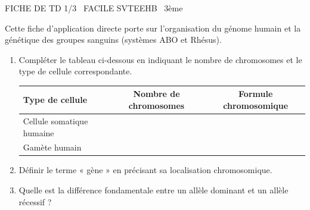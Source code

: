 \documentclass[11pt]{article}
\begin{document}
\begin{tcolorbox}[enhanced,colback=popink,colframe=popink,arc=10pt,boxrule=0pt,left=12pt,right=12pt,top=9pt,bottom=9pt]
{\color{white}\popxbold\small FICHE DE TD 1/3 \textbullet\ FACILE \hfill SVTEEHB \textbullet\ 3ème\par}
\end{tcolorbox}
\vspace{4pt}
Cette fiche d'application directe porte sur l'organisation du génome humain et la génétique des groupes sanguins (systèmes ABO et Rhésus).

\begin{exercice}
\begin{enumerate}
    \item Compléter le tableau ci-dessous en indiquant le nombre de chromosomes et le type de cellule correspondante.
    \begin{tabular}{|l|c|c|}
    \hline
    Type de cellule & Nombre de chromosomes & Formule chromosomique \\ \hline
    Cellule somatique humaine &  &  \\ \hline
    Gamète humain &  &  \\ \hline
    \end{tabular}
    \item Définir le terme « gène » en précisant sa localisation chromosomique.
    \item Quelle est la différence fondamentale entre un allèle dominant et un allèle récessif ?
\end{enumerate}
\end{exercice}
\end{document}

